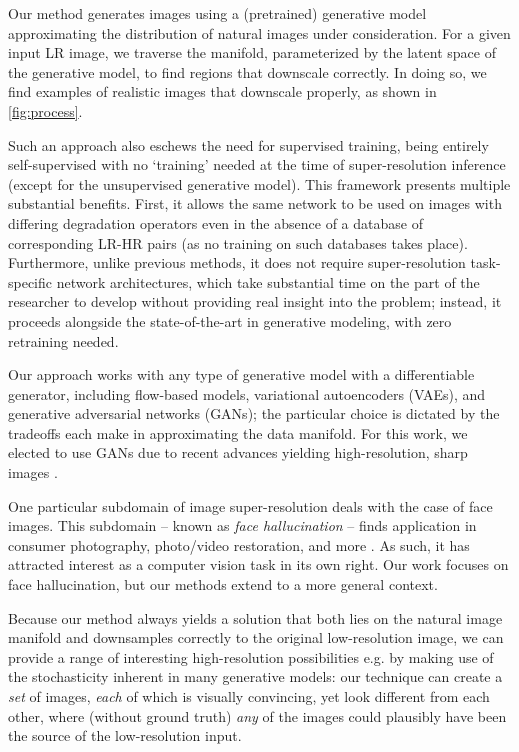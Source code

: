 \documentclass[10pt,twocolumn,letterpaper]{article}
\begin{document}
Our method generates images using a (pretrained) generative model approximating the distribution of natural images under consideration. For a given input LR image, we traverse the manifold, parameterized by the latent space of the generative model, to find regions that downscale correctly. In doing so, we find examples of realistic images that downscale properly, as shown in \ref{fig:process}.

Such an approach also eschews the need for supervised training, being entirely self-supervised with no `training' needed at the time of super-resolution inference (except for the unsupervised generative model). This framework presents multiple substantial benefits. First, it allows the same network to be used on images with differing degradation operators even in the absence of a database of corresponding LR-HR pairs (as no training on such databases takes place). Furthermore, unlike previous methods, it does not require super-resolution task-specific network architectures, which take substantial time on the part of the researcher to develop without providing real insight into the problem; instead, it proceeds alongside the state-of-the-art in generative modeling, with zero retraining needed.

Our approach works with any type of generative model with a differentiable generator, including flow-based models, variational autoencoders (VAEs), and generative adversarial networks (GANs); the particular choice is dictated by the tradeoffs each make in approximating the data manifold. For this work, we elected to use GANs due to recent advances yielding high-resolution, sharp images \cite{karras2019style,karras2017progressive}. 

One particular subdomain of image super-resolution deals with the case of face images. This subdomain -- known as \textit{face hallucination} -- finds application in consumer photography, photo/video restoration, and more \cite{srsurvey}. As such, it has attracted interest as a computer vision task in its own right. Our work focuses on face hallucination, but our methods extend to a more general context.

Because our method always yields a solution that both lies on the natural image manifold and downsamples correctly to the original low-resolution image, we can provide a range of interesting high-resolution possibilities e.g. by making use of the stochasticity inherent in many generative models: our technique can create a \textit{set} of images, \textit{each} of which is visually convincing, yet look different from each other, where (without ground truth) \textit{any} of the images could plausibly have been the source of the low-resolution input.
\end{document}
